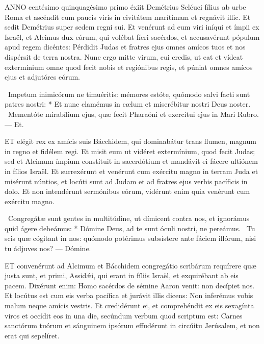 \lettrine[lines=2]{A}{NNO} centésimo quinquagésimo primo éxiit Demétrius Seléuci fílius ab urbe Roma et ascéndit cum paucis viris in civitátem marítimam et regnávit illic. Et sedit Demétrius super sedem regni sui. Et venérunt ad eum viri iníqui et ímpii ex Israël, et Alcimus dux eórum, qui volébat fíeri sacérdos, et accusavérunt pópulum apud regem dicéntes: Pérdidit Judas et fratres ejus omnes amícos tuos et nos dispérsit de terra nostra. Nunc ergo mitte virum, cui credis, ut eat et vídeat extermínium omne quod fecit nobis et regiónibus regis, et púniat omnes amícos ejus et adjutóres eórum.

\R\ Impetum inimicórum ne timuéritis: mémores estóte, quómodo salvi facti sunt patres nostri: * Et nunc clamémus in cælum et miserébitur nostri Deus noster. \V\ Mementóte mirabílium ejus, quæ fecit Pharaóni et exercítui ejus in Mari Rubro. — Et.


\lettrine[lines=2]{E}{T} elégit rex ex amícis suis Bácchidem, qui dominabátur trans flumen, magnum in regno et fidélem regi. Et misit eum ut vidéret extermínium, quod fecit Judas; sed et Alcimum ímpium constítuit in sacerdótium et mandávit ei fácere ultiónem in fílios Israël. Et surrexérunt et venérunt cum exércitu magno in terram Juda et misérunt núntios, et locúti sunt ad Judam et ad fratres ejus verbis pacíficis in dolo. Et non intendérunt sermónibus eórum, vidérunt enim quia venérunt cum exércitu magno.

\R\ Congregátæ sunt gentes in multitúdine, ut dímicent contra nos, et ignorámus quid ágere debeámus: * Dómine Deus, ad te sunt óculi nostri, ne pereámus. \V\ Tu scis quæ cógitant in nos: quómodo potérimus subsístere ante fáciem illórum, nisi tu ádjuves nos? — Dómine.



\lettrine[lines=2]{E}{T} convenérunt ad Alcimum et Bácchidem congregátio scribárum requírere quæ justa sunt, et primi, Assidǽi, qui erant in fíliis Israël, et exquirébant ab eis pacem. Dixérunt enim: Homo sacérdos de sémine Aaron venit: non decípiet nos. Et locútus est cum eis verba pacífica et jurávit illis dicens: Non inferémus vobis malum neque amícis vestris. Et credidérunt ei, et comprehéndit ex eis sexagínta viros et occídit eos in una die, secúndum verbum quod scriptum est: Carnes sanctórum tuórum et sánguinem ipsórum effudérunt in circúitu Jerúsalem, et non erat qui sepelíret.

